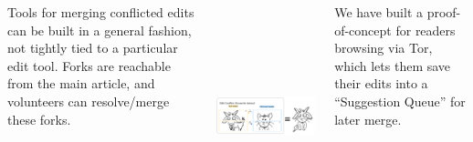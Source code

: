 \documentclass[25pt, a0paper, landscape, cmyk]{tikzposter}
\begin{document}
\begin{columns}
{    \vspace{0.5cm}
  \begin{minipage}{\mw}
    Tools for merging conflicted edits can be built in a general
    fashion, not tightly tied to a particular edit tool.
    Forks are reachable from the main article, and volunteers can
    resolve/merge these forks.
  \end{minipage}\hfill\begin{minipage}{\myfigwidth}
    \includegraphics[height=6.5cm]{favourite-animal.png}
  \end{minipage}
    \vspace{0.75cm}

    We have built a proof-of-concept
    for readers browsing via Tor, which lets them save their
    edits into a ``Suggestion Queue'' for later merge.

}
\end{columns}
\end{document}
